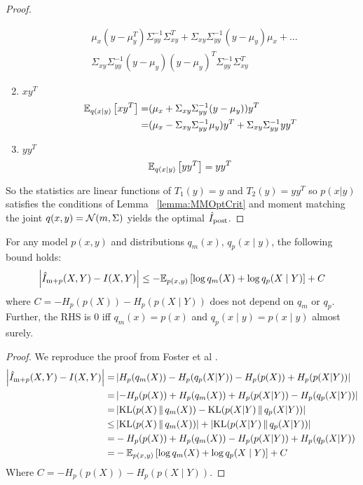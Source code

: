 \begin{proof}
\begin{enumerate}
\begin{align*}
      &\mu_x(y-\mu_y^T)\Sigma_{yy}^{-1}\Sigma_{xy}^T+\Sigma_{xy}\Sigma_{yy}^{-1}(y-\mu_y)\mu_x+\dots\\
      &\Sigma_{xy}\Sigma_{yy}^{-1}(y-\mu_y)(y-\mu_y)^T\Sigma_{yy}^{-1}\Sigma_{xy}^T  
      \end{align*}
      \item $xy^T$
      \begin{align*}
      \mathbb{E}_{q(x|y)}\left[xy^T\right]=&(\mu_x+\Sigma_{xy}\Sigma_{yy}^{-1}(y-\mu_y))y^T\\
      =& (\mu_x-\Sigma_{xy}\Sigma_{yy}^{-1}\mu_y)y^T+\Sigma_{xy}\Sigma_{yy}^{-1}yy^T
      \end{align*}
      \item $yy^T$
      \[\mathbb{E}_{q(x|y)}\left[yy^T\right]=yy^T\]
    \end{enumerate}
    So the statistics are linear functions of $T_1(y)=y$ and $T_2(y)=yy^T$
    so $p(x|y)$ satisfies the conditions of Lemma ~\ref{lemma:MMOptCrit} and 
    moment matching the joint $q(x, y) = \mathcal{N}(m, \Sigma)$ yields the optimal
    $\hat{I}_{\text{post}}$.  
\end{proof}



\renewcommand\thetheorem{4.6}
\begin{lemma}
    For any model $p(x,y)$ and distributions
    $q_m(x)$, $q_p(x\mid y)$, the following bound holds:
    {\fontsize{9}{10}\selectfont \[\left|\hat{I}_{\text{m}+p}(X,Y)-I(X,Y)\right|\leq
    -\mathbb{E}_{p(x,y)}\left[\log q_m(X)+\log q_p(X\mid Y)\right]+C\]} where
    $C=-H_p(p(X))-H_p(p(X\mid Y))$ does not depend on $q_m$ or
    $q_p$. Further, the RHS is $0$ iff $q_m(x)=p(x)$ and $q_p(x\mid
    y)=p(x\mid y)$ almost surely. 
  \end{lemma}
\begin{proof}
  We reproduce the proof from Foster et al \cite{Foster2019}.
    \begin{align}
        \left|\hat{I}_{\text{m}+p}(X,Y)-I(X,Y)\right|=&\left|H_p(q_m(X))-H_p(q_p(X|Y))-H_p(p(X))+H_p(p(X|Y))\right|\\
        =&\left|-H_p(p(X))+H_p(q_m(X))+H_p(p(X|Y))-H_p(q_p(X|Y))\right|\\
        =&\left|\mathrm{KL}(p(X)\,\|\,q_m(X))-\mathrm{KL}(p(X|Y)\,\|\,q_p(X|Y))\right|\\
        \leq&\left|\mathrm{KL}(p(X)\,\|\,q_m(X))\right|+\left|\mathrm{KL}(p(X|Y)\,\|\,q_p(X|Y))\right|\\
        =&-H_p(p(X))+H_p(q_m(X))-H_p(p(X|Y))+H_p(q_p(X|Y))\\
        =& -\mathbb{E}_{p(x,y)}\left[\log q_m(X)+\log q_p(X\mid Y)\right]+C
    \end{align}
    Where $C=-H_p(p(X))-H_p(p(X\mid Y))$.
\end{proof}

